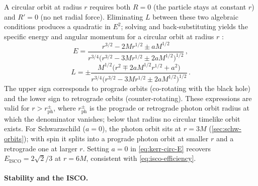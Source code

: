 A circular orbit at radius $r$ requires both $R = 0$ (the particle
stays at constant $r$) and $R' = 0$ (no net radial force).
Eliminating $L$ between these two algebraic conditions produces a
quadratic in $E^2$; solving and back-substituting yields the
specific energy and angular momentum for a circular orbit at
radius $r$ \cite{Bardeen1972}:
%
\begin{equation}
  E = \frac{r^{3/2} - 2Mr^{1/2} \pm aM^{1/2}}
            {r^{3/4}\bigl(r^{3/2} - 3Mr^{1/2} \pm 2aM^{1/2}\bigr)^{1/2}} \,,
  \label{eq:kerr-circ-E}
\end{equation}
%
\begin{equation}
  L = \pm\frac{M^{1/2}\bigl(r^2 \mp 2aM^{1/2}r^{1/2} + a^2\bigr)}
              {r^{3/4}\bigl(r^{3/2} - 3Mr^{1/2} \pm 2aM^{1/2}\bigr)^{1/2}} \,.
  \label{eq:kerr-circ-L}
\end{equation}
%
The upper sign corresponds to prograde orbits (co-rotating with
the black hole) and the lower sign to retrograde orbits
(counter-rotating).  These expressions are valid for
$r > r_{\text{ph}}^{\pm}$, where $r_{\text{ph}}^{\pm}$ is the
prograde or retrograde photon orbit radius at which the denominator
vanishes; below that radius no circular timelike orbit exists.  For
Schwarzschild ($a = 0$), the photon orbit sits at $r = 3M$
(\cref{sec:schw-orbits}); with spin it splits into a prograde
photon orbit at smaller $r$ and a retrograde one at larger $r$.
Setting $a = 0$ in \cref{eq:kerr-circ-E} recovers
$E_{\text{ISCO}} = 2\sqrt{2}/3$ at $r = 6M$, consistent with
\cref{eq:isco-efficiency}.

\paragraph{Stability and the ISCO.}

